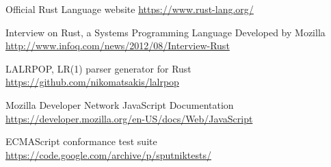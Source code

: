 \documentclass{article}
\begin{document}
\begin{thebibliography}{9}
  Official Rust Language website
  \href{https://www.rust-lang.org/}{https://www.rust-lang.org/}

  Interview on Rust, a Systems Programming Language Developed by Mozilla
  \href{http://www.infoq.com/news/2012/08/Interview-Rust}{http://www.infoq.com/news/2012/08/Interview-Rust}

  LALRPOP, LR(1) parser generator for Rust
  \href{https://github.com/nikomatsakis/lalrpop}{https://github.com/nikomatsakis/lalrpop}

  Mozilla Developer Network JavaScript Documentation
  \href{https://developer.mozilla.org/en-US/docs/Web/JavaScript}{https://developer.mozilla.org/en-US/docs/Web/JavaScript}

  ECMAScript conformance test suite
  \href{https://code.google.com/archive/p/sputniktests/}{https://code.google.com/archive/p/sputniktests/}
\end{thebibliography}
\end{document}
